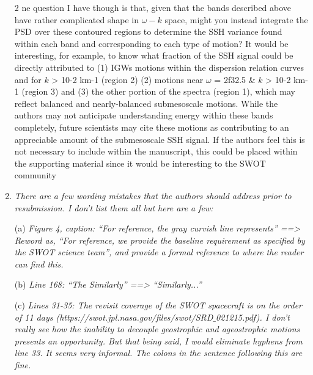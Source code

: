 \documentclass[11pt]{article}
\begin{document}
\begin{enumerate}
{2 ne question I have though is that, given that the bands described above have rather
complicated shape in $\omega-k$ space, might you instead integrate the PSD over these contoured
regions to determine the SSH variance found within each band and corresponding to each
type of motion? It would be interesting, for example, to know what fraction of the SSH signal
could be directly attributed to (1) IGWs motions within the dispersion relation curves and for
$k$ > 10-2 km-1 (region 2) (2) motions near $\omega$ = 2f32.5 \& $k$ > 10-2 km-1 (region 3) and (3) the
other portion of the spectra (region 1), which may reflect balanced and nearly-balanced
submesoscale motions. While the authors may not anticipate understanding energy within
these bands completely, future scientists may cite these motions as contributing to an
appreciable amount of the submesoscale SSH signal. If the authors feel this is not necessary
to include within the manuscript, this could be placed within the supporting material since it
would be interesting to the SWOT community}

\item{\it  There are a few wording mistakes that the authors should address prior to resubmission. I
don’t list them all but here are a few:}

  \subitem (a) {\it Figure 4, caption: “For reference, the gray curvish line represents” ==> Reword as,
  “For reference, we provide the baseline requirement as specified by the SWOT
  science team”, and provide a formal reference to where the reader can find this.}

  \subitem (b) {\it   Line 168: “The Similarly” ==> “Similarly...''}

  \subitem (c) {\it Lines 31-35: The revisit coverage of the SWOT spacecraft is on the order of 11 days
  (https://swot.jpl.nasa.gov/files/swot/SRD$\_$021215.pdf). I don’t really see how the
  inability to decouple geostrophic and ageostrophic motions presents an opportunity.
  But that being said, I would eliminate hyphens from line 33. It seems very informal.
  The colons in the sentence following this are fine.}


\end{enumerate}


\end{document}
